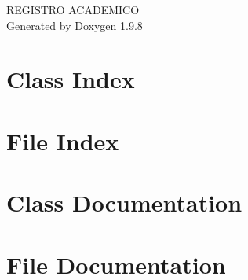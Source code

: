 \documentclass[twoside]{book}
\newcommand{\+}{\discretionary{\mbox{\scriptsize$\hookleftarrow$}}{}{}}
\newcommand{\clearemptydoublepage}{%
    \newpage{\pagestyle{empty}\cleardoublepage}%
  }
\begin{document}
  \raggedbottom
    \hypersetup{pageanchor=false,
                bookmarksnumbered=true,
                pdfencoding=unicode
               }
  \begin{titlepage}
  \vspace*{7cm}
  \begin{center}%
  {\Large REGISTRO ACADEMICO}\\
  \vspace*{1cm}
  {\large Generated by Doxygen 1.9.8}\\
  \end{center}
  \end{titlepage}
  \clearemptydoublepage
  \tableofcontents
  \clearemptydoublepage
  \hypersetup{pageanchor=true}

\chapter{Class Index}

\chapter{File Index}

\chapter{Class Documentation}

\chapter{File Documentation}


  \backmatter
  \newpage
  \clearemptydoublepage
  \printindex
\end{document}
